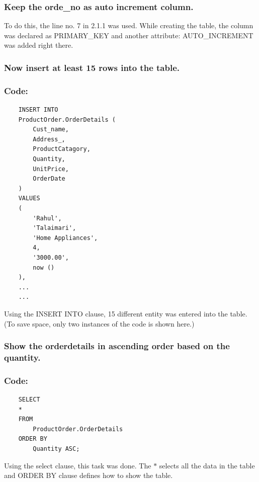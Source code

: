 \documentclass[12pt]{article}
\begin{document}
\vspace{13mm}

\subsubsection{Keep the orde\_no as auto increment column.}
To do this, the line no. 7 in 2.1.1 was used. While creating the table, the column was declared as PRIMARY\_KEY and another attribute: AUTO\_INCREMENT was added right there.

\vspace{13mm}

\subsubsection{Now insert at least 15 rows into the table.}
\subsubsection*{Code:}
\begin{verbatim}
    INSERT INTO
    ProductOrder.OrderDetails (
        Cust_name,
        Address_,
        ProductCatagory,
        Quantity,
        UnitPrice,
        OrderDate
    )
    VALUES
    (
        'Rahul',
        'Talaimari',
        'Home Appliances',
        4,
        '3000.00',
        now ()
    ),
    ...
    ...
\end{verbatim}
Using the INSERT INTO clause, 15 different entity was entered into the table. (To save space, only two instances of the code is shown here.)

\vspace{13mm}

\subsubsection{Show the orderdetails  in ascending order based on the quantity.}
\subsubsection*{Code:}
\begin{verbatim}
    SELECT
    *
    FROM
        ProductOrder.OrderDetails
    ORDER BY
        Quantity ASC;
\end{verbatim}
Using the select clause, this task was done. The $*$ selects all the data in the table and ORDER BY clause defines how to show the table.

\vspace{13mm}
\end{document}
